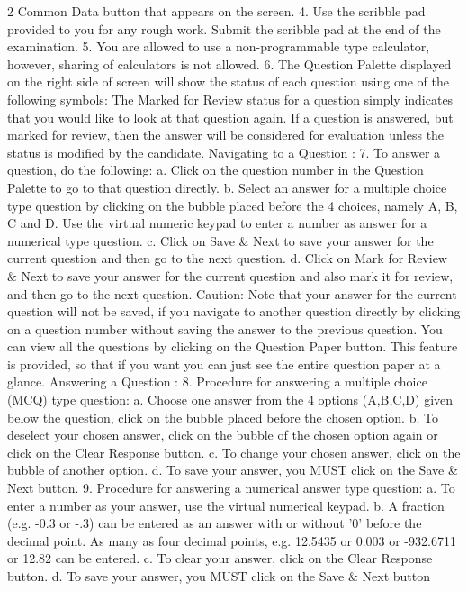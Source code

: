\documentclass[a4paper,10pt,twoside]{article}
\begin{document}
\begin{multicols}{2}
{Common Data button that appears on the screen.
4. Use the scribble pad provided to you for any rough work. Submit the scribble pad at
the end of the examination.
5. You are allowed to use a non-programmable type calculator, however, sharing of
calculators is not allowed.
6. The Question Palette displayed on the right side of screen will show the status of
each question using one of the following symbols:
The Marked for Review status for a question simply indicates that you would like to look at
that question again. If a question is answered, but marked for review, then the answer will
be considered for evaluation unless the status is modified by the candidate.
Navigating to a Question :
7. To answer a question, do the following:
a. Click on the question number in the Question Palette to go to that question
directly.
b. Select an answer for a multiple choice type question by clicking on the bubble
placed before the 4 choices, namely A, B, C and D. Use the virtual numeric
keypad to enter a number as answer for a numerical type question.
c. Click on Save \& Next to save your answer for the current question and then go
to the next question.
d. Click on Mark for Review \& Next to save your answer for the current question
and also mark it for review, and then go to the next question.
Caution: Note that your answer for the current question will not be saved, if you navigate
to another question directly by clicking on a question number without saving the answer to
the previous question.
You can view all the questions by clicking on the Question Paper button. This feature is
provided, so that if you want you can just see the entire question paper at a glance.
Answering a Question :
8. Procedure for answering a multiple choice (MCQ) type question:
a. Choose one answer from the 4 options (A,B,C,D) given below the question,
click on the bubble placed before the chosen option.
b. To deselect your chosen answer, click on the bubble of the chosen option again
or click on the Clear Response button.
c. To change your chosen answer, click on the bubble of another option.
d. To save your answer, you MUST click on the Save \& Next button.
9. Procedure for answering a numerical answer type question:
a. To enter a number as your answer, use the virtual numerical keypad.
b. A fraction (e.g. -0.3 or -.3) can be entered as an answer with or without '0'
before the decimal point. As many as four decimal points, e.g. 12.5435 or
0.003 or -932.6711 or 12.82 can be entered.
c. To clear your answer, click on the Clear Response button.
d. To save your answer, you MUST click on the Save \& Next button
}
\end{multicols}
\end{document}
